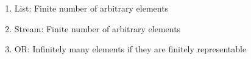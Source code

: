 \begin{enumerate}
\item List: Finite number of arbitrary elements
\item Stream: Finite number of arbitrary elements
\item OR: Infinitely many elements if they are finitely representable
\end{enumerate}
